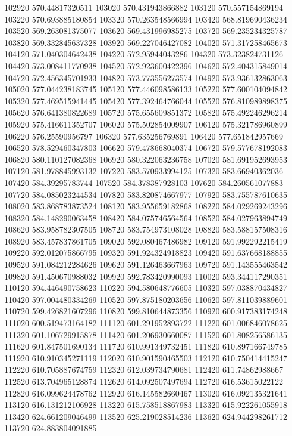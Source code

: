 {102920 570.44817320511
103020 570.431943866882
103120 570.557154869194
103220 570.693885180854
103320 570.263548566994
103420 568.819690436234
103520 569.263081375077
103620 569.431996985275
103720 569.235234325787
103820 569.332845637328
103920 569.227046427082
104020 571.317258465673
104120 571.040304642438
104220 572.95944043286
104320 573.323824731126
104420 573.008411770938
104520 572.923600422396
104620 572.404315849014
104720 572.456345701933
104820 573.773556273574
104920 573.936132863063
105020 577.044238183745
105120 577.446098586133
105220 577.600104094842
105320 577.469515941445
105420 577.392464766044
105520 576.810989898375
105620 576.641380822689
105720 575.655609851372
105820 575.492246296214
105920 575.416611352707
106020 575.502854009907
106120 575.321786960899
106220 576.25590956797
106320 577.635256769891
106420 577.651842957669
106520 578.529460347803
106620 579.478668040374
106720 579.577678192083
106820 580.110127082368
106920 580.322063236758
107020 581.691952693953
107120 581.978845993132
107220 583.570933994125
107320 583.66940362036
107420 584.39295783744
107520 584.378387928103
107620 584.260561077883
107720 584.085023244534
107820 583.820874667977
107920 583.755787610635
108020 583.868783873524
108120 583.955659182868
108220 584.029269243296
108320 584.148290063458
108420 584.075746564564
108520 584.027963894749
108620 583.958782307505
108720 583.754973108028
108820 583.588157508316
108920 583.457837861705
109020 592.080467486982
109120 591.992292215419
109220 592.012075866795
109320 591.924324918823
109420 591.637668188855
109520 591.084212284626
109620 591.126463667963
109720 591.143555463542
109820 591.450670988032
109920 592.783420990093
110020 593.344117290351
110120 594.446490758623
110220 594.580648776605
110320 597.038870434827
110420 597.004480334269
110520 597.875180203656
110620 597.811039889601
110720 599.426821607296
110820 599.810644873356
110920 600.917383174248
111020 600.519473164182
111120 601.291952893722
111220 601.006846078625
111320 601.106729915878
111420 601.206930660087
111520 601.808256586135
111620 601.847501690134
111720 610.991349732451
111820 610.897166749785
111920 610.910345271119
112020 610.901590465503
112120 610.750414415247
112220 610.705887674759
112320 612.039734790681
112420 611.74862988667
112520 613.704965128874
112620 614.092507497694
112720 616.53615022122
112820 616.099624478762
112920 616.145582660467
113020 616.092135321641
113120 616.131212106928
113220 615.758518867983
113320 615.922261055918
113420 624.661209046499
113520 625.219028514236
113620 624.944298261712
113720 624.883804091885
}
